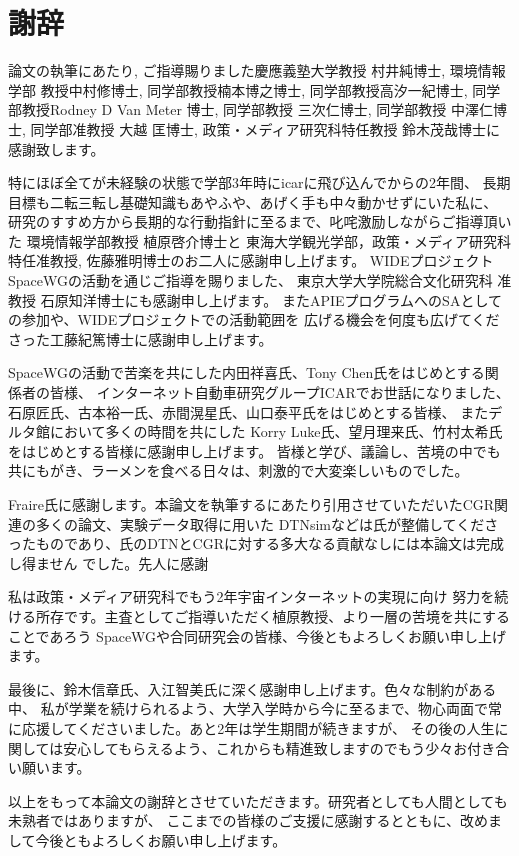\chapter*{謝辞}
論文の執筆にあたり, ご指導賜りました慶應義塾大学教授 村井純博士, 環境情報学部
教授中村修博士, 同学部教授楠本博之博士, 同学部教授高汐一紀博士, 同学部教授Rodney
D Van Meter 博士, 同学部教授 三次仁博士, 同学部教授 中澤仁博士, 同学部准教授 大越
匡博士, 政策・メディア研究科特任教授 鈴木茂哉博士に感謝致します。

特にほぼ全てが未経験の状態で学部3年時にicarに飛び込んでからの2年間、
長期目標も二転三転し基礎知識もあやふや、あげく手も中々動かせずにいた私に、
研究のすすめ方から長期的な行動指針に至るまで、叱咤激励しながらご指導頂いた
環境情報学部教授 植原啓介博士と
東海大学観光学部，政策・メディア研究科特任准教授, 佐藤雅明博士のお二人に感謝申し上げます。
WIDEプロジェクトSpaceWGの活動を通じご指導を賜りました、
東京大学大学院総合文化研究科 准教授 石原知洋博士にも感謝申し上げます。
またAPIEプログラムへのSAとしての参加や、WIDEプロジェクトでの活動範囲を
広げる機会を何度も広げてくださった工藤紀篤博士に感謝申し上げます。

SpaceWGの活動で苦楽を共にした内田祥喜氏、Tony Chen氏をはじめとする関係者の皆様、
インターネット自動車研究グループICARでお世話になりました、
石原匠氏、古本裕一氏、赤間滉星氏、山口泰平氏をはじめとする皆様、
またデルタ館において多くの時間を共にした
Korry Luke氏、望月理来氏、竹村太希氏をはじめとする皆様に感謝申し上げます。
皆様と学び、議論し、苦境の中でも共にもがき、ラーメンを食べる日々は、刺激的で大変楽しいものでした。

Fraire氏に感謝します。本論文を執筆するにあたり引用させていただいたCGR関連の多くの論文、実験データ取得に用いた
DTNsimなどは氏が整備してくださったものであり、氏のDTNとCGRに対する多大なる貢献なしには本論文は完成し得ません
でした。先人に感謝

私は政策・メディア研究科でもう2年宇宙インターネットの実現に向け
努力を続ける所存です。主査としてご指導いただく植原教授、より一層の苦境を共にすることであろう
SpaceWGや合同研究会の皆様、今後ともよろしくお願い申し上げます。

最後に、鈴木信章氏、入江智美氏に深く感謝申し上げます。色々な制約がある中、
私が学業を続けられるよう、大学入学時から今に至るまで、物心両面で常に応援してくださいました。あと2年は学生期間が続きますが、
その後の人生に関しては安心してもらえるよう、これからも精進致しますのでもう少々お付き合い願います。

以上をもって本論文の謝辞とさせていただきます。研究者としても人間としても未熟者ではありますが、
ここまでの皆様のご支援に感謝するとともに、改めまして今後ともよろしくお願い申し上げます。


